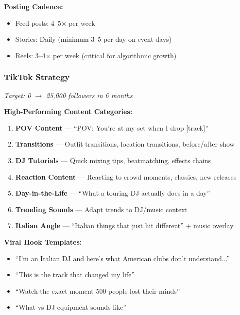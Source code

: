 \documentclass[11pt,a4paper]{article}
\begin{document}
\noindent\textbf{Posting Cadence:}
\begin{itemize}[leftmargin=*]
    \item Feed posts: 4--5$\times$ per week
    \item Stories: Daily (minimum 3--5 per day on event days)
    \item Reels: 3--4$\times$ per week (critical for algorithmic growth)
\end{itemize}

\subsubsection{TikTok Strategy}
\textit{Target: 0 $\rightarrow$ 25,000 followers in 6 months}

\vspace{0.5em}
\noindent\textbf{High-Performing Content Categories:}

\begin{enumerate}[leftmargin=*]
    \item \textbf{POV Content} --- ``POV: You're at my set when I drop [track]''
    \item \textbf{Transitions} --- Outfit transitions, location transitions, before/after show
    \item \textbf{DJ Tutorials} --- Quick mixing tips, beatmatching, effects chains
    \item \textbf{Reaction Content} --- Reacting to crowd moments, classics, new releases
    \item \textbf{Day-in-the-Life} --- ``What a touring DJ actually does in a day''
    \item \textbf{Trending Sounds} --- Adapt trends to DJ/music context
    \item \textbf{Italian Angle} --- ``Italian things that just hit different'' + music overlay
\end{enumerate}

\noindent\textbf{Viral Hook Templates:}
\begin{itemize}[leftmargin=*]
    \item ``I'm an Italian DJ and here's what American clubs don't understand...''
    \item ``This is the track that changed my life''
    \item ``Watch the exact moment 500 people lost their minds''
    \item ``What  vs  DJ equipment sounds like''
\end{itemize}
\end{document}
